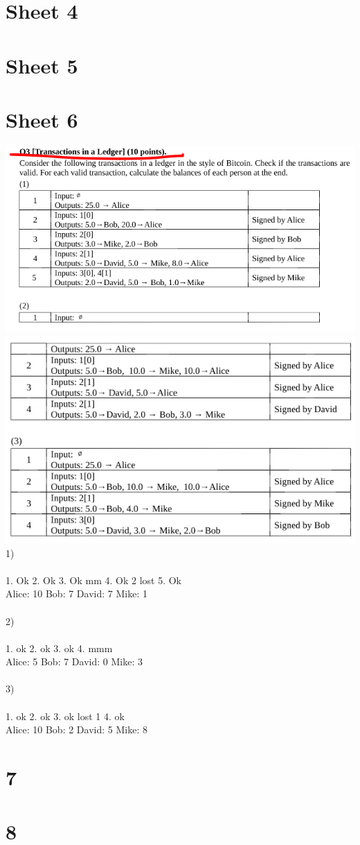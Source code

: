 \documentclass{article}
\begin{document}
\section{Sheet 4}
\section{Sheet 5}
\section{Sheet 6}
\includegraphics[scale=1]{6.png}\\
\includegraphics[scale=1]{7.png}\\
1)\\\\
1. Ok
2. Ok
3. Ok mm
4. Ok 2 lost
5. Ok
\\
Alice: 10
Bob: 7
David: 7
Mike: 1
\\\\
2)
\\\\
1. ok
2. ok
3. ok
4. mmm
\\
Alice: 5
Bob: 7
David: 0
Mike: 3
\\\\
3)
\\\\
1. ok
2. ok
3. ok lost 1
4. ok
\\
Alice: 10
Bob: 2
David: 5
Mike: 8

\section{7}
\section{8}
\end{document}
